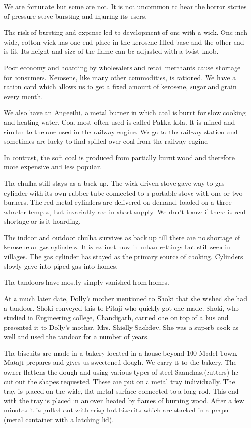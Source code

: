 We are fortunate but some are not. It is not uncommon to hear the horror
stories of pressure stove bursting and injuring its users. 

The risk of bursting and expense led to development of one with a wick.
One inch wide, cotton wick has one end place in the kerosene filled base
and the other end is lit. Its height and size of the flame can be adjusted
with a twist knob. 

Poor economy and hoarding by wholesalers and retail merchants cause
shortage for consumers. Kerosene, like many other commodities, is
rationed. We have a ration card which allows us to get a fixed amount of
kerosene, sugar and grain every month. 

We also have an Angeethi, a metal burner in which coal is burnt for slow
cooking and heating water. Coal most often used is called Pakka kola. It
is mined and similar to the one used in the railway engine. We go to the
railway station and sometimes are lucky to find spilled over coal from the
railway engine. 

In contrast, the soft coal is produced from partially burnt wood and
therefore more expensive and less popular. 

The chulha still stays as a back up. The wick driven stove gave way to gas
cylinder with its own rubber tube connected to a portable stove with one
or two burners. The red metal cylinders are delivered on demand, loaded on
a three wheeler tempos, but invariably are in short supply. We don’t know
if there is real shortage or is it hoarding. 

The indoor and outdoor chulha survives as back up till there are no
shortage of kerosene or gas cylinders. It is extinct now in urban settings
but still seen in villages. The gas cylinder has stayed as the primary
source of cooking. Cylinders slowly gave into piped gas into homes. 

The tandoors have mostly simply vanished from homes. 

At a much later date, Dolly's mother mentioned to Shoki that she wished
she had a tandoor. Shoki conveyed this to Pitaji who quickly got one made.
Shoki, who studied in Engineering college, Chandigarh, carried one on top
of a bus and presented it to Dolly's mother, Mrs. Shielly Sachdev. She was
a superb cook as well and used the tandoor for a number of years. 

The biscuits are made in a bakery located in a house beyond 100 Model
Town. Mataji prepares and gives us sweetened dough. We carry it to the
bakery. The owner flattens the dough and using various types of steel
Saanchas,(cutters) he cut out the shapes requested. These are put on
a metal tray individually. The tray is placed on the wide, flat metal
surface connected to a long rod. This end with the tray is placed in an
oven heated by flames of burning wood. After a few minutes it is pulled
out with crisp hot biscuits which are stacked in a peepa (metal container
with a latching lid). 

